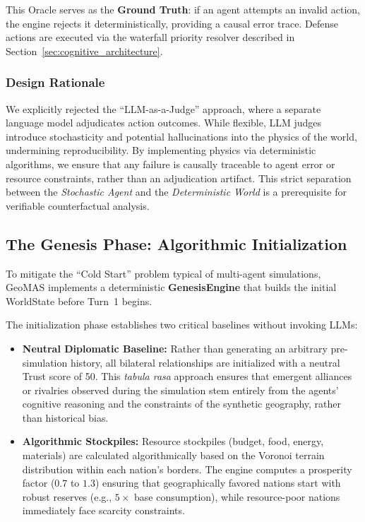 This Oracle serves as the \textbf{Ground Truth}: if an agent attempts an invalid action, the engine rejects it deterministically, providing a causal error trace. Defense actions are executed via the waterfall priority resolver described in Section~\ref{sec:cognitive_architecture}.

\subsubsection{Design Rationale} We explicitly rejected the ``LLM-as-a-Judge'' approach, where a separate language model adjudicates action outcomes. While flexible, LLM judges introduce stochasticity and potential hallucinations into the physics of the world, undermining reproducibility. By implementing physics via deterministic algorithms, we ensure that any failure is causally traceable to agent error or resource constraints, rather than an adjudication artifact. This strict separation between the \textit{Stochastic Agent} and the \textit{Deterministic World} is a prerequisite for verifiable counterfactual analysis.

\subsection{The Genesis Phase: Algorithmic Initialization}
\label{sec:genesis}
To mitigate the ``Cold Start'' problem typical of multi-agent simulations, GeoMAS implements a deterministic \textbf{GenesisEngine} that builds the initial WorldState before Turn~1 begins.

The initialization phase establishes two critical baselines without invoking LLMs:
\begin{itemize}
    \item \textbf{Neutral Diplomatic Baseline:} Rather than generating an arbitrary pre-simulation history, all bilateral relationships are initialized with a neutral Trust score of 50. This \textit{tabula rasa} approach ensures that emergent alliances or rivalries observed during the simulation stem entirely from the agents' cognitive reasoning and the constraints of the synthetic geography, rather than historical bias.
    \item \textbf{Algorithmic Stockpiles:} Resource stockpiles (budget, food, energy, materials) are calculated algorithmically based on the Voronoi terrain distribution within each nation's borders. The engine computes a prosperity factor ($0.7$ to $1.3$) ensuring that geographically favored nations start with robust reserves (e.g., $5\times$ base consumption), while resource-poor nations immediately face scarcity constraints.
\end{itemize}

